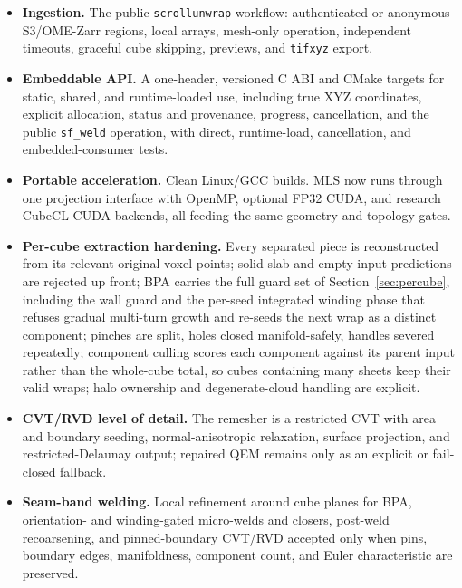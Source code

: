 {\small
\begin{itemize}
  \setlength{\itemsep}{0pt}
  \item \textbf{Ingestion.} The public \texttt{scrollunwrap} workflow: authenticated or anonymous S3/OME-Zarr regions, local arrays, mesh-only operation, independent timeouts, graceful cube skipping, previews, and \texttt{tifxyz} export.

  \item \textbf{Embeddable API.} A one-header, versioned C ABI and CMake targets for static, shared, and runtime-loaded use, including true XYZ coordinates, explicit allocation, status and provenance, progress, cancellation, and the public \texttt{sf\_weld} operation, with direct, runtime-load, cancellation, and embedded-consumer tests.

  \item \textbf{Portable acceleration.} Clean Linux/GCC builds. MLS now runs through one projection interface with OpenMP, optional FP32 CUDA, and research CubeCL CUDA backends, all feeding the same geometry and topology gates.

  \item \textbf{Per-cube extraction hardening.} Every separated piece is reconstructed from its relevant original voxel points; solid-slab and empty-input predictions are rejected up front; BPA carries the full guard set of Section~\ref{sec:percube}, including the wall guard and the per-seed integrated winding phase that refuses gradual multi-turn growth and re-seeds the next wrap as a distinct component; pinches are split, holes closed manifold-safely, handles severed repeatedly; component culling scores each component against its parent input rather than the whole-cube total, so cubes containing many sheets keep their valid wraps; halo ownership and degenerate-cloud handling are explicit.

  \item \textbf{CVT/RVD level of detail.} The remesher is a restricted CVT with area and boundary seeding, normal-anisotropic relaxation, surface projection, and restricted-Delaunay output; repaired QEM remains only as an explicit or fail-closed fallback.

  \item \textbf{Seam-band welding.} Local refinement around cube planes for BPA, orientation- and winding-gated micro-welds and closers, post-weld recoarsening, and pinned-boundary CVT/RVD accepted only when pins, boundary edges, manifoldness, component count, and Euler characteristic are preserved.


\end{itemize}}
